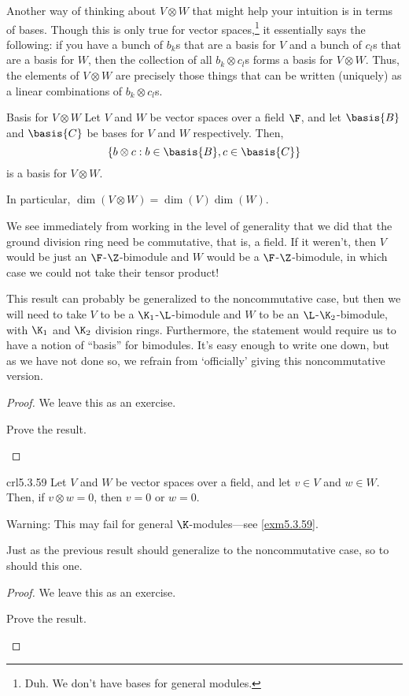 Another way of thinking about $V\otimes W$ that might help your intuition is in terms of bases.  Though this is only true for vector spaces,\footnote{Duh.  We don't have bases for general modules.} it essentially says the following:  if you have a bunch of $b_k$s that are a basis for $V$ and a bunch of $c_l$s that are a basis for $W$, then the collection of all $b_k\otimes c_l$s forms a basis for $V\otimes W$.  Thus, the elements of $V\otimes W$ are precisely those things that can be written (uniquely) as a linear combinations of $b_k\otimes c_l$s.
\begin{prp}{Basis for $V\otimes W$}{}
	Let $V$ and $W$ be vector spaces over a field $\F$, and let $\basis{B}$ and $\basis{C}$ be bases for $V$ and $W$ respectively.  Then,
	\begin{equation}
	\left\{ b\otimes c:b\in \basis{B},c\in \basis{C}\right\}
	\end{equation}
	is a basis for $V\otimes W$.
	\begin{rmk}
		In particular, $\dim (V\otimes W)=\dim (V)\dim (W)$.
	\end{rmk}
	\begin{rmk}
		We see immediately from working in the level of generality that we did that the ground division ring need be commutative, that is, a field.  If it weren't, then $V$ would be just an $\F$-$\Z$-bimodule and $W$ would be a $\F$-$\Z$-bimodule, in which case we could not take their tensor product!
	\end{rmk}
	\begin{rmk}
		This result can probably be generalized to the noncommutative case, but then we will need to take $V$ to be a $\K _1$-$\L$-bimodule and $W$ to be an $\L$-$\K _2$-bimodule, with $\K _1$ and $\K _2$ division rings.  Furthermore, the statement would require us to have a notion of ``basis'' for bimodules.  It's easy enough to write one down, but as we have not done so, we refrain from `officially' giving this noncommutative version.
	\end{rmk}
	\begin{proof}
		We leave this as an exercise.
		\begin{exr}[breakable=false]{}{}
			Prove the result.
		\end{exr}
	\end{proof}
\end{prp}
\begin{crl}{}{crl5.3.59}
	Let $V$ and $W$ be vector spaces over a field, and let $v\in V$ and $w\in W$.  Then, if $v\otimes w=0$, then $v=0$ or $w=0$.
	\begin{rmk}
		Warning:  This may fail for general $\K$-modules---see \cref{exm5.3.59}.
	\end{rmk}
	\begin{rmk}
		Just as the previous result should generalize to the noncommutative case, so to should this one.
	\end{rmk}
	\begin{proof}
		We leave this as an exercise.
		\begin{exr}[breakable=false]{}{}
			Prove the result.
		\end{exr}
	\end{proof}
\end{crl}
